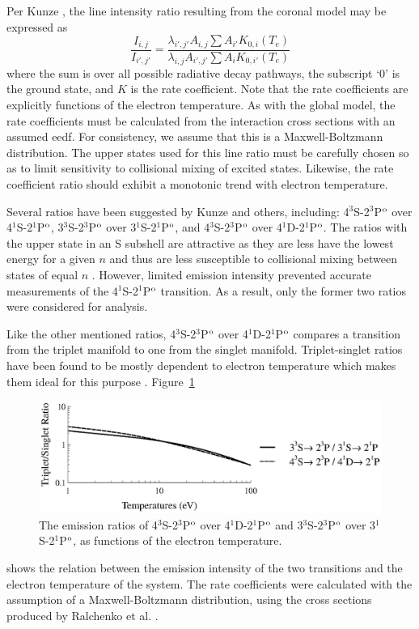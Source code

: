 Per Kunze \cite{Kunze2009}, the line intensity ratio resulting from the coronal
model may be expressed as
\begin{equation}
  \frac{I_{i,j}}{I_{i',j'}} = \frac{\lambda_{i',j'}A_{i,j}\sum A_{i'} K_{0,i}(T_e)}
  {\lambda_{i,j}A_{i',j'}\sum A_{i} K_{0,i'}(T_e)}
\end{equation}
where the sum is over all possible radiative decay pathways, the subscript `0'
is the ground state, and $K$ is the rate coefficient. Note that the rate
coefficients are explicitly functions of the electron temperature. As with the
global model, the rate coefficients must be calculated from the interaction
cross sections with an assumed \acs{eedf}. For consistency, we assume that this
is a Maxwell-Boltzmann distribution. The upper states used for this line ratio
must be carefully chosen so as to limit sensitivity to collisional mixing of
excited states. Likewise, the rate coefficient ratio should exhibit a monotonic
trend with electron temperature.

Several ratios have been suggested by Kunze and others, including:
4$^3$S-2$^3$P$^\mathrm{o}$ over 4$^1$S-2$^1$P$^\mathrm{o}$, 3$^3$S-2$^3$P$^\mathrm{o}$ over
3$^1$S-2$^1$P$^\mathrm{o}$, and 4$^3$S-2$^3$P$^\mathrm{o}$ over 4$^1$D-2$^1$P$^\mathrm{o}$. The
ratios with the upper state in an S subshell are attractive as they are less
have the lowest energy for a given $n$ and thus are less susceptible to
collisional mixing between states of equal $n$ \cite{Kunze2009}. However,
limited emission intensity prevented accurate measurements of the
4$^1$S-2$^1$P$^\mathrm{o}$ transition. As a result, only the former two ratios were
considered for analysis.

Like the other mentioned ratios, 4$^3$S-2$^3$P$^\mathrm{o}$ over 4$^1$D-2$^1$P$^\mathrm{o}$
compares a transition from the triplet manifold to one from the singlet
manifold. Triplet-singlet ratios have been found to be mostly dependent to
electron temperature which makes them ideal for this purpose \cite{Griem2005}.
Figure~\ref{fig:conversion}
\begin{figure}
  \centering
  \includegraphics{./chapters/emissions/figures/conversion.eps}
  \caption{The emission ratios of 4$^3$S-2$^3$P$^\mathrm{o}$ over 4$^1$D-2$^1$P$^\mathrm{o}$ 
    and 3$^3$S-2$^3$P$^\mathrm{o}$ over 3$^1$S-2$^1$P$^\mathrm{o}$, as functions of the
    electron temperature.}
  \label{fig:conversion}
\end{figure}
shows the relation between the emission intensity of the two transitions and the
electron temperature of the system. The rate coefficients were calculated with
the assumption of a Maxwell-Boltzmann distribution, using the cross sections
produced by Ralchenko et al. \cite{Ralchenko2008}. 

